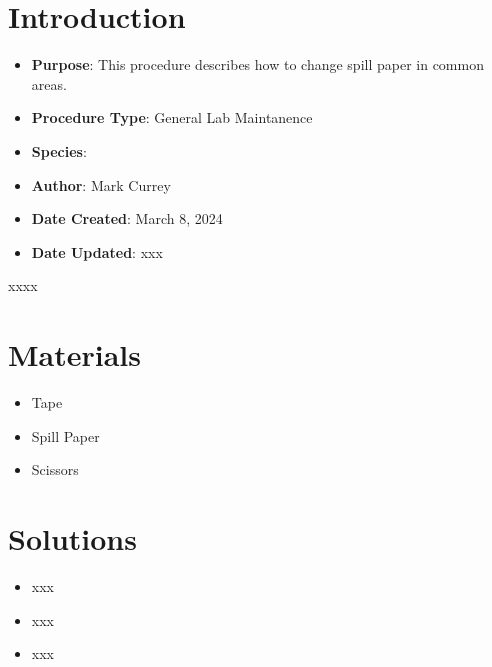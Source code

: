 \documentclass[
  letterpaper,
  DIV=11,
  numbers=noendperiod]{scrreprt}
\providecommand{\tightlist}{%
  \setlength{\itemsep}{0pt}\setlength{\parskip}{0pt}}\usepackage{longtable,booktabs,array}
\begin{document}
\hypertarget{introduction-6}{%
\section{Introduction}\label{introduction-6}}

\begin{itemize}
\item
  \textbf{Purpose}: This procedure describes how to change spill paper
  in common areas.
\item
  \textbf{Procedure Type}: General Lab Maintanence
\item
  \textbf{Species}:
\item
  \textbf{Author}: Mark Currey
\item
  \textbf{Date Created}: March 8, 2024
\item
  \textbf{Date Updated}: xxx
\end{itemize}

\begin{tcolorbox}[enhanced jigsaw, toprule=.15mm, breakable, coltitle=black, leftrule=.75mm, title=\textcolor{quarto-callout-warning-color}{\faExclamationTriangle}\hspace{0.5em}{NOTES}, bottomrule=.15mm, toptitle=1mm, bottomtitle=1mm, colframe=quarto-callout-warning-color-frame, opacityback=0, colback=white, opacitybacktitle=0.6, colbacktitle=quarto-callout-warning-color!10!white, rightrule=.15mm, titlerule=0mm, arc=.35mm, left=2mm]

xxxx

\end{tcolorbox}

\hypertarget{materials-6}{%
\section{Materials}\label{materials-6}}

\begin{itemize}
\tightlist
\item
  Tape
\item
  Spill Paper
\item
  Scissors
\end{itemize}

\hypertarget{solutions-6}{%
\section{Solutions}\label{solutions-6}}

\begin{itemize}
\tightlist
\item
  xxx
\item
  xxx
\item
  xxx
\end{itemize}
\end{document}
